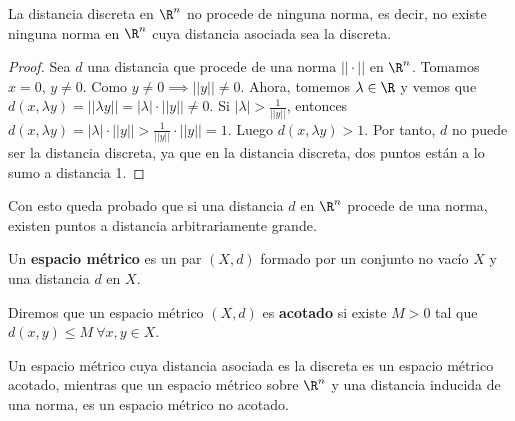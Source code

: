 \begin{properties}
  La distancia discreta en $\R^n$ no procede de ninguna norma, es decir, no existe ninguna norma en $\R^n$ cuya distancia asociada sea la discreta.
\end{properties}
\begin{proof}
  Sea $d$ una distancia que procede de una norma $||\cdot||$ en $\R^n$. Tomamos $x=0$, $y\neq0$. Como $y \neq 0 \implies ||y|| \neq 0$. Ahora, tomemos $\lambda\in\R$ y vemos que $d(x,\lambda y) = ||\lambda y|| = |\lambda|\cdot||y||\neq 0$.
  Si $|\lambda| > \frac{1}{||y||}$, entonces $d(x,\lambda y) = |\lambda| \cdot ||y|| > \frac{1}{||y||} \cdot ||y||=1$. Luego $d(x,\lambda y) > 1$. Por tanto, $d$ no puede ser la distancia discreta, ya que en la distancia discreta, dos puntos están a lo sumo a distancia 1.
\end{proof}
Con esto queda probado que si una distancia $d$ en $\R^n$ procede de una norma, existen puntos a distancia arbitrariamente grande.

\begin{ndef}
  Un \textbf{espacio métrico} es un par $(X,d)$ formado por un conjunto no vacío $X$ y una distancia $d$ en $X$.
\end{ndef}
\begin{ndef}
  Diremos que un espacio métrico $(X,d)$ es \textbf{acotado} si existe $M>0$ tal que $d(x,y)\leq M \ \forall x,y \in X$.
\end{ndef}
\begin{exmp}
  Un espacio métrico cuya distancia asociada es la discreta es un espacio métrico acotado, mientras que un espacio métrico sobre $\R^n$ y una distancia inducida de una norma, es un espacio métrico no acotado.
\end{exmp}

